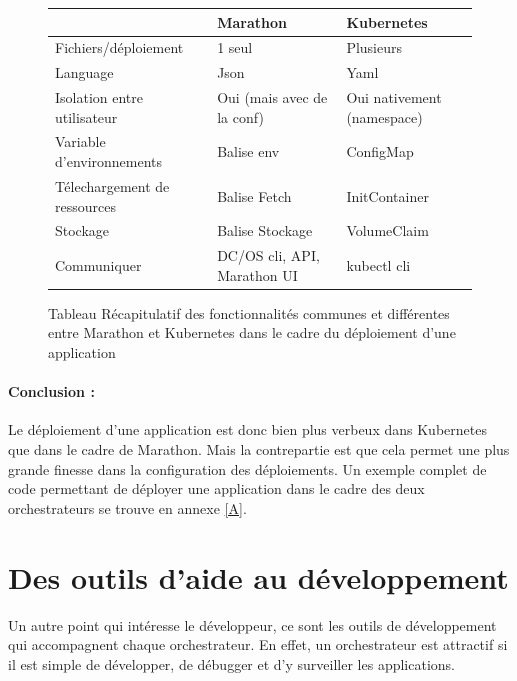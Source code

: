 \documentclass[11pt,fleqn]{book} %
\begin{document}
\begin{figure}[H]\centering
\begin{tabular}{@{}lll@{}}
\toprule
                             & Marathon       & Kubernetes      \\ \midrule
Fichiers/déploiement         & 1 seul         & Plusieurs       \\
Language                     & Json           & Yaml            \\
Isolation entre utilisateur & Oui (mais avec de la conf)            & Oui nativement (namespace) \\
Variable d'environnements    & Balise env     & ConfigMap       \\
Télechargement de ressources & Balise Fetch   & InitContainer   \\
Stockage                     & Balise Stockage & VolumeClaim     \\
Communiquer & DC/OS cli, API, Marathon UI & kubectl cli\bottomrule
\end{tabular}
\caption{Tableau Récapitulatif des fonctionnalités communes et différentes entre Marathon et Kubernetes dans le cadre du déploiement d'une application}
\label{tab:my-table}
\end{figure}


\begin{interrupt}
\paragraph{Conclusion :}
Le déploiement d'une application est donc bien plus verbeux dans Kubernetes que dans le cadre de Marathon. Mais la contrepartie est que cela permet une plus grande finesse dans la configuration des déploiements. Un exemple complet de code permettant de déployer une application dans le cadre des deux orchestrateurs se trouve en annexe \ref{A}.
\end{interrupt}

\section{Des outils d'aide au développement}
Un autre point qui intéresse le développeur, ce sont les outils de développement qui accompagnent chaque orchestrateur. En effet, un orchestrateur est attractif si il est simple de développer, de débugger et d'y surveiller les applications.\\
\end{document}
